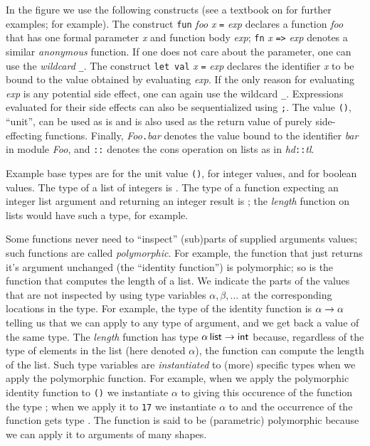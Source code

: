 \documentclass[workingdraft,endnotes]{usetex-v1}
\begin{document}
In the figure we use the following \sml constructs
(see a textbook on \sml for further examples;
\cite{Hansen-Rischel:1999,Paulson:1996} for example). The construct
\texttt{fun} \textit{foo} \textit{x} \texttt{=} \textit{exp} declares
a function \textit{foo} that has one formal parameter \textit{x} and
function body \textit{exp}; \texttt{fn} \textit{x} \texttt{=>}
\textit{exp} denotes a similar \emph{anonymous} function. If one does
not care about the parameter, one can use the \emph{wildcard}
\texttt{\_}. The construct \texttt{let}~\texttt{val} \textit{x} \texttt{=}
\textit{exp} declares the identifier \textit{x} to be bound to the
value obtained by evaluating \textit{exp}. If the only reason
for evaluating \textit{exp} is any potential side effect, one
can again use the wildcard \texttt{\_}. Expressions evaluated for
their side effects can also be sequentialized using \texttt{;}.
The value \texttt{()}, ``unit'', can be used as is and is also used
as the return value of purely side-effecting functions.
Finally, \textit{Foo}\texttt{.}\textit{bar} denotes the value bound
to the identifier \textit{bar} in module \textit{Foo}, and
\texttt{::} denotes the cons operation on lists as in
\textit{hd}\texttt{::}\textit{tl}.

Example base types are {\tUnit} for the unit value \texttt{()},
{\tInt} for integer values, and {\tBool} for boolean values. The type
of a list of integers is \tList{\tInt}. The type of a function
expecting an integer list argument and returning an integer result is
\tArrow{(\tList\tInt)}{\tInt}; the \textit{length} function on lists
would have such a type, for example. 

Some functions never need to
``inspect'' (sub)parts of supplied arguments values; such functions
are called \emph{polymorphic}. For example, the function that just
returns it's argument unchanged (the ``identity function'') is
polymorphic; so is the function that computes the length of a list. We
indicate the parts of the values that are not inspected by using type
variables $\alpha, \beta, \ldots$ at the corresponding locations in
the type. For example, the type of the identity function is
${\alpha}\rightarrow{\alpha}$ telling us that we can apply to any type of
argument, and we get back a value of the same type. The
\textit{length} function has type ${{\alpha}\,\textsf{list}}\rightarrow{\textsf{int}}$
because, regardless of the type of elements in the list (here denoted
$\alpha$), the function can compute the length of the list. Such type
variables are \emph{instantiated} to (more) specific types when we
apply the polymorphic function. For example, when we apply the
polymorphic identity function to \texttt{()} we instantiate $\alpha$
to {\tUnit} giving this occurence of the function the type
\tArrow\tUnit\tUnit; when we apply it to \texttt{17} we instantiate
$\alpha$ to {\tInt} and the occurrence of the function gets type
\tArrow\tInt\tInt. The function is said to be (parametric) polymorphic
because we can apply it to arguments of many shapes.
\end{document}
